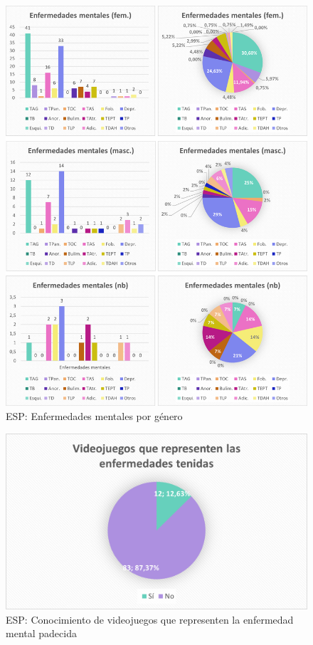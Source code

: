 \documentclass[12pt, a4paper,twoside,titlepage]{book}
\begin{document}
\begin{figure}
    \centering
    \includegraphics[width=1\linewidth]{ANEXO ESP/26AnexESPEnf}
    \caption{ESP: Enfermedades mentales por género}
    \label{fig:ESPTenidasgen}
\end{figure}

\begin{figure}
    \centering
    \includegraphics[width=.8\linewidth]{ANEXO ESP/27AnexESPEnftenidas}
    \caption{ESP: Conocimiento de videojuegos que representen la enfermedad mental padecida}
    \label{fig:ESPVidenf}
\end{figure}
\end{document}
